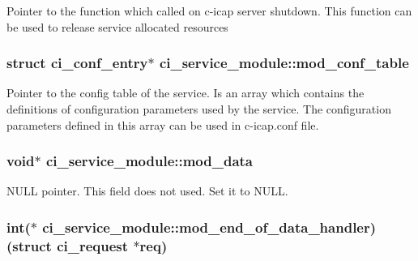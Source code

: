 Pointer to the function which called on c-\/icap server shutdown. This function can be used to release service allocated resources \hypertarget{structci__service__module_a51f0f2512caf13fc7c39337e2060686d}{
\subsubsection[{mod\_\-conf\_\-table}]{\setlength{\rightskip}{0pt plus 5cm}struct {\bf ci\_\-conf\_\-entry}$\ast$ {\bf ci\_\-service\_\-module::mod\_\-conf\_\-table}}}
\label{structci__service__module_a51f0f2512caf13fc7c39337e2060686d}


Pointer to the config table of the service. Is an array which contains the definitions of configuration parameters used by the service. The configuration parameters defined in this array can be used in c-\/icap.conf file. \hypertarget{structci__service__module_a548856fadc824a5dcc627664e738f2c9}{
\subsubsection[{mod\_\-data}]{\setlength{\rightskip}{0pt plus 5cm}void$\ast$ {\bf ci\_\-service\_\-module::mod\_\-data}}}
\label{structci__service__module_a548856fadc824a5dcc627664e738f2c9}


NULL pointer. This field does not used. Set it to NULL. \hypertarget{structci__service__module_a4308d4de90013030d311b56d01ba1d53}{
\subsubsection[{mod\_\-end\_\-of\_\-data\_\-handler}]{\setlength{\rightskip}{0pt plus 5cm}int($\ast$ {\bf ci\_\-service\_\-module::mod\_\-end\_\-of\_\-data\_\-handler})(struct ci\_\-request $\ast$req)}}
\label{structci__service__module_a4308d4de90013030d311b56d01ba1d53}


